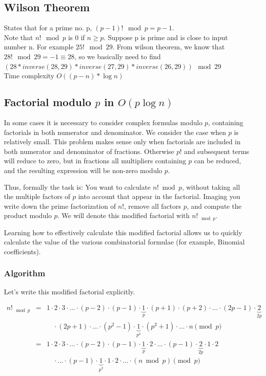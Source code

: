 \documentclass[8pt, a4paper, oneside, twocolumn]{extarticle}
\begin{document}
\subsection{Wilson Theorem}
States that for a prime no. p, $(p - 1)! \mod p = p - 1$.
\\Note that $n! \mod p$ is 0 if $n \geq p$. Suppose p is prime and is close to input number n. For example $25! \mod 29$. From wilson theorem, we know that $28! \mod 29 = -1 \equiv 28$, so we basically need to find $(28 * inverse(28, 29) * inverse (27, 29) * inverse (26, 29)) \mod 29$
\\Time complexity $O((p - n) * \log n)$
\subsection{Factorial modulo $p$ in $O(p \log n)$}
In some cases it is necessary to consider complex formulas modulo $p$, containing factorials in both numerator and denominator. We consider the case when $p$ is relatively small. This problem makes sense only when factorials are included in both numerator and denominator of fractions. Otherwise $p!$ and subsequent terms will reduce to zero, but in fractions all multipliers containing $p$ can be reduced, and the resulting expression will be non-zero modulo $p$.

Thus, formally the task is: You want to calculate $n! \bmod p$, without taking all the multiple factors of $p$ into account that appear in the factorial. Imaging you write down the prime factorization of $n!$, remove all factors $p$, and compute the product modulo $p$. We will denote this modified factorial with $n!_{\mod p}$.

Learning how to effectively calculate this modified factorial allows us to quickly calculate the value of the various combinatorial formulae (for example, Binomial coefficients).

\subsubsection{Algorithm}
Let's write this modified factorial explicitly.

\begin{eqnarray}n!_{\mod p} &=& 1 \cdot 2 \cdot 3 \cdot \ldots \cdot (p-2) \cdot (p-1) \cdot \underbrace{1}_{p} \cdot (p+1) \cdot (p+2) \cdot \ldots \cdot (2p-1) \cdot \underbrace{2}_{2p} \\
& &\quad \cdot (2p+1) \cdot \ldots \cdot (p^2-1) \cdot \underbrace{1}_{p^2} \cdot (p^2 +1) \cdot \ldots \cdot n \pmod{p} \\ &=& 1 \cdot 2 \cdot 3 \cdot \ldots \cdot (p-2) \cdot (p-1) \cdot \underbrace{1}_{p} \cdot 2 \cdot \ldots \cdot (p-1) \cdot \underbrace{2}_{2p} \cdot 1 \cdot 2 \\
& &\quad \cdot \ldots \cdot (p-1) \cdot \underbrace{1}_{p^2} \cdot 1 \cdot 2 \cdot \ldots \cdot (n \bmod p) \pmod{p} \end{eqnarray}
\end{document}
